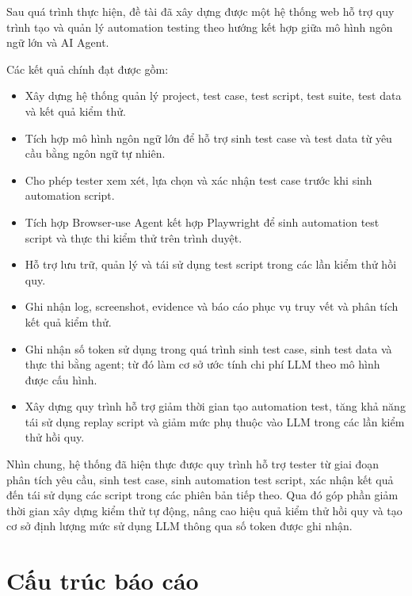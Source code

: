 Sau quá trình thực hiện, đề tài đã xây dựng được một hệ thống web hỗ trợ quy trình tạo và quản lý automation testing theo hướng kết hợp giữa mô hình ngôn ngữ lớn và AI Agent.

Các kết quả chính đạt được gồm:

\begin{itemize}
    \item Xây dựng hệ thống quản lý project, test case, test script, test suite, test data và kết quả kiểm thử.

    \item Tích hợp mô hình ngôn ngữ lớn để hỗ trợ sinh test case và test data từ yêu cầu bằng ngôn ngữ tự nhiên.

    \item Cho phép tester xem xét, lựa chọn và xác nhận test case trước khi sinh automation script.

    \item Tích hợp Browser-use Agent kết hợp Playwright để sinh automation test script và thực thi kiểm thử trên trình duyệt.

    \item Hỗ trợ lưu trữ, quản lý và tái sử dụng test script trong các lần kiểm thử hồi quy.

    \item Ghi nhận log, screenshot, evidence và báo cáo phục vụ truy vết và phân tích kết quả kiểm thử.

    \item Ghi nhận số token sử dụng trong quá trình sinh test case, sinh test data và thực thi bằng agent; từ đó làm cơ sở ước tính chi phí LLM theo mô hình được cấu hình.

    \item Xây dựng quy trình hỗ trợ giảm thời gian tạo automation test, tăng khả năng tái sử dụng replay script và giảm mức phụ thuộc vào LLM trong các lần kiểm thử hồi quy.
\end{itemize}

Nhìn chung, hệ thống đã hiện thực được quy trình hỗ trợ tester từ giai đoạn phân tích yêu cầu, sinh test case, sinh automation test script, xác nhận kết quả đến tái sử dụng các script trong các phiên bản tiếp theo. Qua đó góp phần giảm thời gian xây dựng kiểm thử tự động, nâng cao hiệu quả kiểm thử hồi quy và tạo cơ sở định lượng mức sử dụng LLM thông qua số token được ghi nhận.

\section{Cấu trúc báo cáo}

